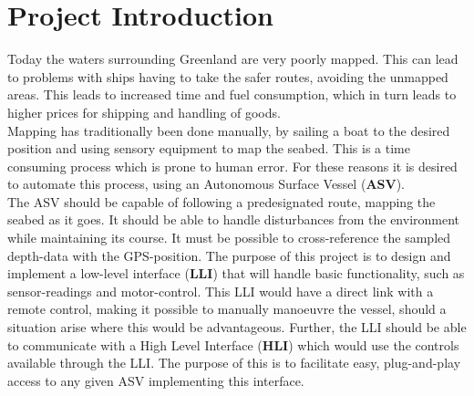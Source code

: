 

\chapter{Project Introduction}
Today the waters surrounding Greenland are very poorly mapped. This can lead to problems with ships having to take the safer routes, avoiding the unmapped areas. This leads to increased time and fuel consumption, which in turn leads to higher prices for shipping and handling of goods.\\
Mapping has traditionally been done manually, by sailing a boat to the desired position and using sensory equipment to map the seabed. This is a time consuming process which is prone to human error. For these reasons it is desired to automate this process, using an Autonomous Surface Vessel (\textbf{ASV}).\\
The ASV should be capable of following a predesignated route, mapping the seabed as it goes. It should be able to handle disturbances from the environment while maintaining its course. It must be possible to cross-reference the sampled depth-data with the GPS-position.
The purpose of this project is to design and implement a low-level interface (\textbf{LLI}) that will handle basic functionality, such as sensor-readings and motor-control. This LLI would have a direct link with a remote control, making it possible to manually manoeuvre the vessel, should a situation arise where this would be advantageous. Further, the LLI should be able to communicate with a High Level Interface (\textbf{HLI}) which would use the controls available through the LLI. The purpose of this is to facilitate easy, plug-and-play access to any given ASV implementing this interface.



